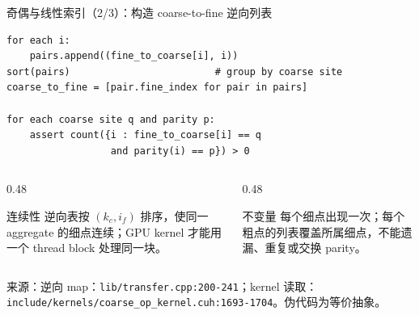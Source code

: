 \documentclass[UTF8,aspectratio=169,11pt]{ctexbeamer}
\newcommand{\source}[1]{\vspace{0.05em}\par{\raggedright\scriptsize\color{muted}来源：#1\par}}
\newcommand{\codepath}[1]{\nolinkurl{#1}}
\begin{document}
\begin{frame}[fragile,t]{奇偶与线性索引（2/3）：构造 coarse-to-fine 逆向列表}
  \begin{lstlisting}[firstnumber=1]
for each i:
    pairs.append((fine_to_coarse[i], i))
sort(pairs)                         # group by coarse site
coarse_to_fine = [pair.fine_index for pair in pairs]

for each coarse site q and parity p:
    assert count({i : fine_to_coarse[i] == q
                  and parity(i) == p}) > 0
  \end{lstlisting}
  \begin{columns}[T,totalwidth=\textwidth]
    \begin{column}{0.48\textwidth}
      \begin{block}{连续性}
        逆向表按 \((k_c,i_f)\) 排序，使同一 aggregate 的细点连续；GPU kernel 才能用一个 thread block 处理同一块。
      \end{block}
    \end{column}
    \begin{column}{0.48\textwidth}
      \begin{alertblock}{不变量}
        每个细点出现一次；每个粗点的列表覆盖所属细点，不能遗漏、重复或交换 parity。
      \end{alertblock}
    \end{column}
  \end{columns}
  \source{逆向 map：\codepath{lib/transfer.cpp:200-241}；kernel 读取：\codepath{include/kernels/coarse_op_kernel.cuh:1693-1704}。伪代码为等价抽象。}
\end{frame}
\end{document}
